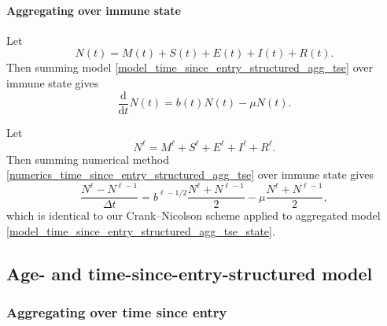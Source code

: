 \documentclass[USenglish]{article}
\newcommand{\md}{\mathrm{d}}
\begin{document}
\paragraph{Aggregating over immune state}

Let
\begin{equation}
  N(t)
  = M(t) + S(t) + E(t) + I(t) + R(t).
\end{equation}
Then summing model \eqref{model_time_since_entry_structured_agg_tse}
over immune state gives
\begin{equation}
  \label{model_time_since_entry_structured_agg_tse_state}
  \frac{\md}{\md t} N(t)
  = b(t) N(t) - \mu N(t).
\end{equation}

Let
\begin{equation}
  N^{\ell}
  = M^{\ell} + S^{\ell} + E^{\ell} + I^{\ell} + R^{\ell}.
\end{equation}
Then summing numerical method
\eqref{numerics_time_since_entry_structured_agg_tse} over immune state
gives
\begin{equation}
  \label{numerics_time_since_entry_structured_agg_tse_state}
  \frac{N^{\ell} - N^{\ell - 1}}{\Delta t}
  = b^{\ell - 1 / 2} \frac{N^{\ell} + N^{\ell - 1}}{2}
  - \mu \frac{N^{\ell} + N^{\ell - 1}}{2},
\end{equation}
which is identical to our Crank--Nicolson scheme applied to aggregated
model \eqref{model_time_since_entry_structured_agg_tse_state}.



\subsection{Age- and time-since-entry-structured model}


\subsubsection{Aggregating over time since entry}
\end{document}
